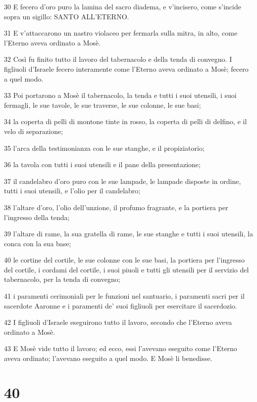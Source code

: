 \par 30 E fecero d'oro puro la lamina del sacro diadema, e v'incisero, come s'incide sopra un sigillo: SANTO ALL'ETERNO.
\par 31 E v'attaccarono un nastro violaceo per fermarla sulla mitra, in alto, come l'Eterno aveva ordinato a Mosè.
\par 32 Così fu finito tutto il lavoro del tabernacolo e della tenda di convegno. I figliuoli d'Israele fecero interamente come l'Eterno aveva ordinato a Mosè; fecero a quel modo.
\par 33 Poi portarono a Mosè il tabernacolo, la tenda e tutti i suoi utensili, i suoi fermagli, le sue tavole, le sue traverse, le sue colonne, le sue basi;
\par 34 la coperta di pelli di montone tinte in rosso, la coperta di pelli di delfino, e il velo di separazione;
\par 35 l'arca della testimonianza con le sue stanghe, e il propiziatorio;
\par 36 la tavola con tutti i suoi utensili e il pane della presentazione;
\par 37 il candelabro d'oro puro con le sue lampade, le lampade disposte in ordine, tutti i suoi utensili, e l'olio per il candelabro;
\par 38 l'altare d'oro, l'olio dell'unzione, il profumo fragrante, e la portiera per l'ingresso della tenda;
\par 39 l'altare di rame, la sua gratella di rame, le sue stanghe e tutti i suoi utensili, la conca con la sua base;
\par 40 le cortine del cortile, le sue colonne con le sue basi, la portiera per l'ingresso del cortile, i cordami del cortile, i suoi piuoli e tutti gli utensili per il servizio del tabernacolo, per la tenda di convegno;
\par 41 i paramenti cerimoniali per le funzioni nel santuario, i paramenti sacri per il sacerdote Aaronne e i paramenti de' suoi figliuoli per esercitare il sacerdozio.
\par 42 I figliuoli d'Israele eseguirono tutto il lavoro, secondo che l'Eterno aveva ordinato a Mosè.
\par 43 E Mosè vide tutto il lavoro; ed ecco, essi l'avevano eseguito come l'Eterno aveva ordinato; l'avevano eseguito a quel modo. E Mosè li benedisse.

\chapter{40}

